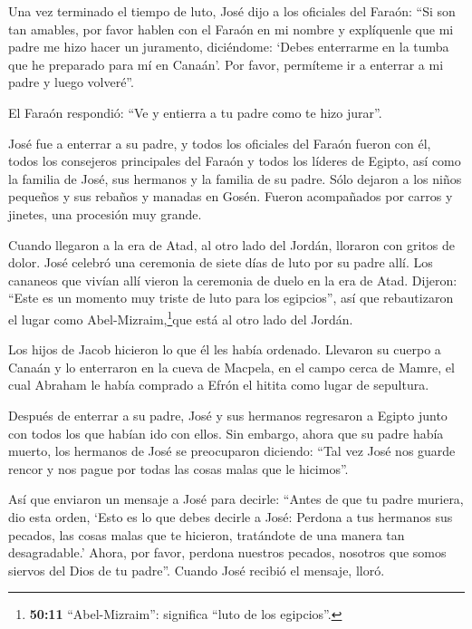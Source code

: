  Una vez terminado el tiempo de luto, José dijo a los
oficiales del Faraón: ``Si son tan amables, por favor hablen con el
Faraón en mi nombre y explíquenle que  mi padre me hizo
hacer un juramento, diciéndome: `Debes enterrarme en la tumba que he
preparado para mí en Canaán'. Por favor, permíteme ir a enterrar a mi
padre y luego volveré''.

 El Faraón respondió: ``Ve y entierra a tu padre como te
hizo jurar''.

 José fue a enterrar a su padre, y todos los oficiales del
Faraón fueron con él, todos los consejeros principales del Faraón y
todos los líderes de Egipto,  así como la familia de José,
sus hermanos y la familia de su padre. Sólo dejaron a los niños pequeños
y sus rebaños y manadas en Gosén.  Fueron acompañados por
carros y jinetes, una procesión muy grande.

 Cuando llegaron a la era de Atad, al otro lado del Jordán,
lloraron con gritos de dolor. José celebró una ceremonia de siete días
de luto por su padre allí.  Los cananeos que vivían allí
vieron la ceremonia de duelo en la era de Atad. Dijeron: ``Este es un
momento muy triste de luto para los egipcios'', así que rebautizaron el
lugar como Abel-Mizraim,\footnote{\textbf{50:11} ``Abel-Mizraim'':
  significa ``luto de los egipcios''.}que está al otro lado del Jordán.

 Los hijos de Jacob hicieron lo que él les había ordenado.
 Llevaron su cuerpo a Canaán y lo enterraron en la cueva de
Macpela, en el campo cerca de Mamre, el cual Abraham le había comprado a
Efrón el hitita como lugar de sepultura.

 Después de enterrar a su padre, José y sus hermanos
regresaron a Egipto junto con todos los que habían ido con ellos.
 Sin embargo, ahora que su padre había muerto, los hermanos
de José se preocuparon diciendo: ``Tal vez José nos guarde rencor y nos
pague por todas las cosas malas que le hicimos''.

 Así que enviaron un mensaje a José para decirle: ``Antes
de que tu padre muriera, dio esta orden,  `Esto es lo que
debes decirle a José: Perdona a tus hermanos sus pecados, las cosas
malas que te hicieron, tratándote de una manera tan desagradable.'
Ahora, por favor, perdona nuestros pecados, nosotros que somos siervos
del Dios de tu padre''. Cuando José recibió el mensaje, lloró.

